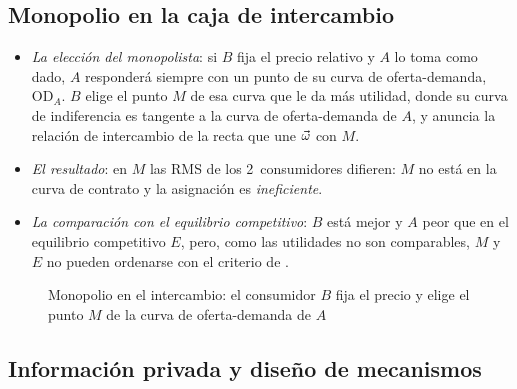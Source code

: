 \documentclass[11pt]{article}
\begin{document}
\subsection{Monopolio en la caja de intercambio}\label{anexo:monopolio-caja}

\begin{itemize}
\item \emph{La elección del monopolista}: si $B$ fija el precio relativo y $A$ lo toma como dado, $A$ responderá siempre con un punto de su curva de oferta-demanda, $\mathrm{OD}_A$. $B$ elige el punto $M$ de esa curva que le da más utilidad, donde su curva de indiferencia es tangente a la curva de oferta-demanda de $A$, y anuncia la relación de intercambio de la recta que une $\vec{\omega}$ con $M$.
\item \emph{El resultado}: en $M$ las RMS de los 2~consumidores difieren: $M$ no está en la curva de contrato y la asignación es \emph{ineficiente}.
\item \emph{La comparación con el equilibrio competitivo}: $B$ está mejor y $A$ peor que en el equilibrio competitivo $E$, pero, como las utilidades no son comparables, $M$ y $E$ no pueden ordenarse con el criterio de \nocite{Segura1986Analisis}.
\end{itemize}

\begin{figure}[H]
\centering
\caption{Monopolio en el intercambio: el consumidor $B$ fija el precio y elige el punto $M$ de la curva de oferta-demanda de $A$}\label{fig:monopolio-intercambio}
\end{figure}

\subsection{Información privada y diseño de mecanismos}\label{anexo:diseno-mecanismos}
\end{document}
